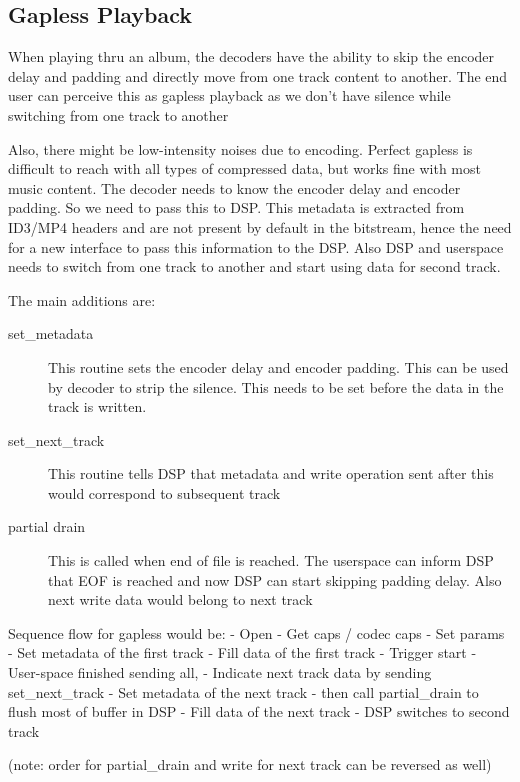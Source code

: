 \documentclass[a4paper,8pt,english]{sphinxmanual}
\begin{document}
\subsection{Gapless Playback}
\label{sound/designs/compress-offload:gapless-playback}
When playing thru an album, the decoders have the ability to skip the encoder
delay and padding and directly move from one track content to another. The end
user can perceive this as gapless playback as we don't have silence while
switching from one track to another

Also, there might be low-intensity noises due to encoding. Perfect gapless is
difficult to reach with all types of compressed data, but works fine with most
music content. The decoder needs to know the encoder delay and encoder padding.
So we need to pass this to DSP. This metadata is extracted from ID3/MP4 headers
and are not present by default in the bitstream, hence the need for a new
interface to pass this information to the DSP. Also DSP and userspace needs to
switch from one track to another and start using data for second track.

The main additions are:
\begin{description}
\item[{set\_metadata}] \leavevmode
This routine sets the encoder delay and encoder padding. This can be used by
decoder to strip the silence. This needs to be set before the data in the track
is written.

\item[{set\_next\_track}] \leavevmode
This routine tells DSP that metadata and write operation sent after this would
correspond to subsequent track

\item[{partial drain}] \leavevmode
This is called when end of file is reached. The userspace can inform DSP that
EOF is reached and now DSP can start skipping padding delay. Also next write
data would belong to next track

\end{description}

Sequence flow for gapless would be:
- Open
- Get caps / codec caps
- Set params
- Set metadata of the first track
- Fill data of the first track
- Trigger start
- User-space finished sending all,
- Indicate next track data by sending set\_next\_track
- Set metadata of the next track
- then call partial\_drain to flush most of buffer in DSP
- Fill data of the next track
- DSP switches to second track

(note: order for partial\_drain and write for next track can be reversed as well)
\end{document}
